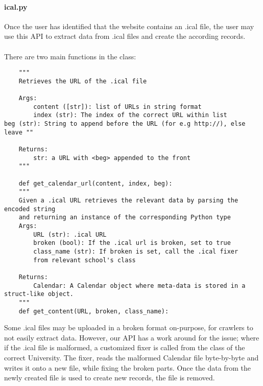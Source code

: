 \documentclass[a4paper,11pt]{article}
\begin{document}
    \paragraph{ical.py} Once the user has identified that the website contains an .ical file, the user may use this API to extract data from .ical files and create the according records.\\ \\ There are two main functions in the class:
    \begin{verbatim}
    """
    Retrieves the URL of the .ical file
    
    Args:
        content ([str]): list of URLs in string format
        index (str): The index of the correct URL within list
beg (str): String to append before the URL (for e.g http://), else leave ""

    Returns:
        str: a URL with <beg> appended to the front 
    """
    
    def get_calendar_url(content, index, beg):
    """
    Given a .ical URL retrieves the relevant data by parsing the encoded string 
    and returning an instance of the corresponding Python type
    Args:
        URL (str): .ical URL
        broken (bool): If the .ical url is broken, set to true
        class_name (str): If broken is set, call the .ical fixer 
        from relevant school's class 
        
    Returns:
        Calendar: A Calendar object where meta-data is stored in a struct-like object.
    """
    def get_content(URL, broken, class_name):
    \end{verbatim}
    Some .ical files may be uploaded in a broken format on-purpose, for crawlers to not easily extract data. However, our API has a work around for the issue; where if the .ical file is malformed, a customized fixer is called from the class of the correct University. The fixer, reads the malformed Calendar file byte-by-byte and writes it onto a new file, while fixing the broken parts. Once the data from the newly created file is used to create new records, the file is removed. \\
\end{document}
